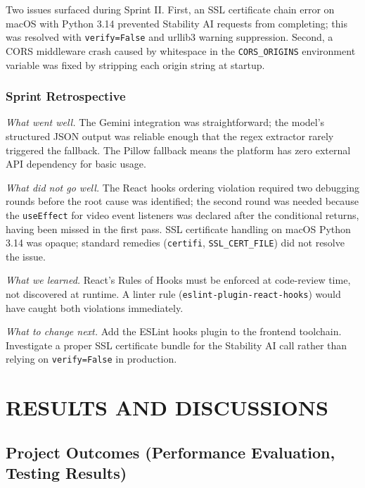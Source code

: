 \documentclass[12pt,a4paper,oneside]{report}
\begin{document}
Two issues surfaced during Sprint II. First, an SSL certificate chain error on macOS with Python 3.14 prevented Stability AI requests from completing; this was resolved with \texttt{verify=False} and urllib3 warning suppression. Second, a CORS middleware crash caused by whitespace in the \texttt{CORS\_ORIGINS} environment variable was fixed by stripping each origin string at startup.

\subsection{Sprint Retrospective}

\textit{What went well.} The Gemini integration was straightforward; the model's structured JSON output was reliable enough that the regex extractor rarely triggered the fallback. The Pillow fallback means the platform has zero external API dependency for basic usage.

\textit{What did not go well.} The React hooks ordering violation required two debugging rounds before the root cause was identified; the second round was needed because the \texttt{useEffect} for video event listeners was declared after the conditional returns, having been missed in the first pass. SSL certificate handling on macOS Python 3.14 was opaque; standard remedies (\texttt{certifi}, \texttt{SSL\_CERT\_FILE}) did not resolve the issue.

\textit{What we learned.} React's Rules of Hooks must be enforced at code-review time, not discovered at runtime. A linter rule (\texttt{eslint-plugin-react-hooks}) would have caught both violations immediately.

\textit{What to change next.} Add the ESLint hooks plugin to the frontend toolchain. Investigate a proper SSL certificate bundle for the Stability AI call rather than relying on \texttt{verify=False} in production.

\chapter{RESULTS AND DISCUSSIONS}

\section{Project Outcomes (Performance Evaluation, Testing Results)}
\end{document}
